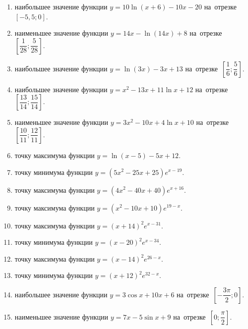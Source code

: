 \documentclass[a4paper,10pt]{article}
\begin{document}
\begin{enumerate}
\item {} наибольшее значение функции $y = 10\ln \left(x+6\right)-10x -20$ на~отрезке~$\left[-5,5;0\right]$.

\item {} наименьшее значение функции $y = 14x-\ln \left(14x\right)+8$ на~отрезке~$\left[\dfrac{1}{28};\dfrac{5}{28}\right]$.

\item {} наибольшее значение функции $y = \ln \left(3x\right)-3x+13$ на~отрезке~$\left[\dfrac{1}{6};\dfrac{5}{6}\right]$.

\item {} наибольшее значение функции $y=x^2-13x+11\ln x+12$ на~отрезке~$\left[\dfrac{13}{14};\dfrac{15}{14}\right]$.

\item {} наименьшее значение функции $y=3x^2-10x+4\ln x+10$ на~отрезке~$\left[\dfrac{10}{11};\dfrac{12}{11}\right]$.

\item {} точку максимума функции $y=\ln \left(x-5\right)-5x+12$.

\item {} точку минимума функции $y=\left(5x^2-25x+25\right)e^{x-19}$.

\item {} точку максимума функции $y=\left(4x^2-40x+40\right)e^{x+16}$.

\item {} точку максимума функции $y=\left(x^2-10x+10\right)e^{19-x}$.

\item {} точку максимума функции $y=\left(x +14\right)^2e^{x-31}$.

\item {} точку минимума функции $y=\left(x -20\right)^2e^{x-34}$.

\item {} точку максимума функции $y=\left(x -14\right)^2e^{26-x}$.

\item {} точку минимума функции $y=\left(x +12\right)^2e^{32-x}$.

\item {} наибольшее значение функции $y=3\cos x+10x +6$ на~отрезке~$\left[-\dfrac{3\pi }{2};0\right]$.

\item {} наименьшее значение функции $y=7x-5\sin x +9$ на~отрезке~$\left[0;\dfrac{\pi }{2}\right]$.


\end{enumerate}
\end{document}
